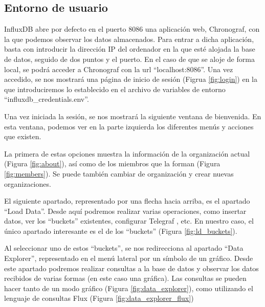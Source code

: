 \subsection{Entorno de usuario}

InfluxDB abre por defecto en el puerto 8086 una aplicación web, Chronograf, con la que podemos observar los datos 
almacenados. Para entrar a dicha aplicación, basta con introducir la dirección IP del ordenador en la que esté 
alojada la base de datos, seguido de dos puntos y el puerto. En el caso de que se aloje de forma local, se podrá 
acceder a Chronograf con la url ``localhost:8086''. Una vez accedido, se nos mostrará una página de inicio de sesión 
(Figrua \ref{fig:login}) en la que introduciremos lo establecido en el archivo de variables de entorno ``influxdb\_credentials.env''.


Una vez iniciada la sesión, se nos mostrará la siguiente ventana de bienvenida. En esta ventana, podemos ver en la 
parte izquierda los diferentes menús y acciones que existen.


La primera de estas opciones muestra la información de la organización actual (Figura \ref{fig:about}), así como de los miembros que la forman (Figura \ref{fig:members}).
Se puede también cambiar de organización y crear nuevas organizaciones.


El siguiente apartado, representado por una flecha hacia arriba, es el apartado ``Load Data''. Desde aquí podremos realizar 
varias operaciones, como insertar datos, ver los ``buckets'' existentes, configurar Telegraf \cite{telegraf}, etc. En nuestro 
caso, el único apartado interesante es el de los ``buckets'' (Figura \ref{fig:ld_buckets}).


Al seleccionar uno de estos ``buckets'', se nos redirecciona al apartado ``Data Explorer'', representado en el menú 
lateral por un símbolo de un gráfico. Desde este apartado podremos realizar consultas a la base de datos y observar los 
datos recibidos de varias formas (en este caso una gráfica). Las consultas se pueden hacer tanto de un modo gráfico (Figura \ref{fig:data_explorer}),
como utilizando el lenguaje de consultas Flux \cite{flux} (Figura \ref{fig:data_explorer_flux})


